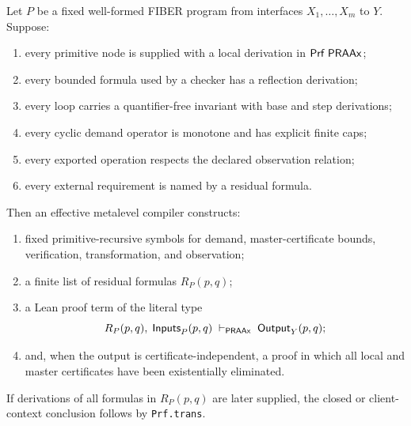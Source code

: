 \begin{theorem}
\label{thm:compilation}
Let \(P\) be a fixed well-formed FIBER program from interfaces
\(X_1,\ldots,X_m\) to \(Y\).  Suppose:

\begin{enumerate}
\item every primitive node is supplied with a local derivation in
      \(\mathsf{Prf}\;\mathsf{PRAAx}\);
\item every bounded formula used by a checker has a reflection derivation;
\item every loop carries a quantifier-free invariant with base and step
      derivations;
\item every cyclic demand operator is monotone and has explicit finite caps;
\item every exported operation respects the declared observation relation;
\item every external requirement is named by a residual formula.
\end{enumerate}

Then an effective metalevel compiler constructs:

\begin{enumerate}
\item fixed primitive-recursive symbols for demand, master-certificate bounds,
      verification, transformation, and observation;
\item a finite list of residual formulas \(R_P(p,q)\);
\item a Lean proof term of the literal type
\[
 R_P(p,q),\;\mathsf{Inputs}_P(p,q)
 \;\vdash_{\mathsf{PRAAx}}\;
 \mathsf{Output}_Y(p,q);
\]
\item and, when the output is certificate-independent, a proof in which all
      local and master certificates have been existentially eliminated.
\end{enumerate}

If derivations of all formulas in \(R_P(p,q)\) are later supplied, the closed
or client-context conclusion follows by \texttt{Prf.trans}.
\end{theorem}


